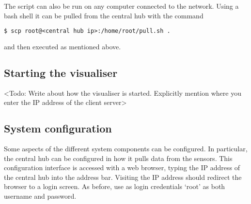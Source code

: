 \documentclass[../document.tex]{subfiles}
\begin{document}
The script can also be run on any computer connected to the network. Using a bash shell it can be pulled from the central hub with the command
\begin{lstlisting}
$ scp root@<central hub ip>:/home/root/pull.sh .
\end{lstlisting}
and then executed as mentioned above.

\subsection{Starting the visualiser}
{\color{red} <Todo: Write about how the visualiser is started. Explicitly mention where you enter the IP address of the client server>}


\subsection{System configuration}
Some aspects of the different system components can be configured. In particular, the central hub can be configured in how it pulls data from the sensors. This configuration interface is accessed with a web browser, typing the IP address of the central hub into the address bar. Visiting the IP address should redirect the browser to a login screen. As before, use as login credentials ‘root’ as both username and password.
\end{document}
